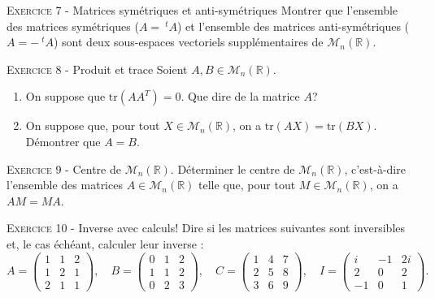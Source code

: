 

\vskip0.3cm\noindent\textsc{Exercice 7} - Matrices symétriques et anti-symétriques
\vskip0.2cm
Montrer que l'ensemble des matrices symétriques ($A=\ ^t\!A$) et l'ensemble des matrices anti-symétriques ($A=-\ ^t\!A$) sont deux sous-espaces vectoriels supplémentaires de $\mathcal M_n(\mathbb R)$.





\vskip0.3cm\noindent\textsc{Exercice 8} - Produit et trace
\vskip0.2cm
Soient $A,B\in\mathcal M_n(\mathbb R)$. 
\begin{enumerate}
\item On suppose que $\textrm{tr}(AA^T)=0$. Que dire de la matrice $A$?
\item On suppose que, pour tout $X\in\mathcal M_n(\mathbb R)$, on a $\textrm{tr}(AX)=\textrm{tr}(BX)$. Démontrer que $A=B$.
\end{enumerate}




\vskip0.3cm\noindent\textsc{Exercice 9} - Centre de $\mathcal M_n(\mathbb R)$.
\vskip0.2cm
Déterminer le centre de $\mathcal M_n(\mathbb R)$, c'est-à-dire l'ensemble des matrices $A\in\mathcal M_n(\mathbb R)$ telle que, pour tout $M\in\mathcal M_n(\mathbb R)$, on a $AM=MA$.




\vskip0.3cm\noindent\textsc{Exercice 10} - Inverse avec calculs!
\vskip0.2cm
Dire si les matrices suivantes sont inversibles et, le
cas échéant, calculer leur inverse :
$$A=\left(
\begin{array}{rcl}
1&1&2\\
1&2&1\\
2&1&1
\end{array}
\right),\quad
B=\left(
\begin{array}{rcl}
0&1&2\\
1&1&2\\
0&2&3
\end{array}
\right),\quad 
C=\left(
\begin{array}{rcl}
1&4&7\\
2&5&8\\
3&6&9
\end{array}\right),\quad
I=\left(
\begin{array}{rcl}
i&-1&2i\\
2&0&2\\
-1&0&1
\end{array}\right).$$



